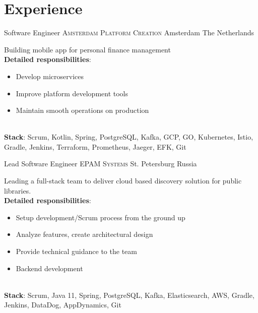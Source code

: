 \documentclass[11pt,a4paper,sans]{moderncv}
\begin{document}
\makecvtitle %


\section{Experience}

    {Software Engineer}
    {\textsc{Amsterdam Platform Creation}}
    {Amsterdam}
    {The Netherlands}
    {
        Building mobile app for personal finance management
        \\
        \textbf{Detailed responsibilities}:
        \begin{itemize}
            \item Develop microservices
            \item Improve platform development tools
            \item Maintain smooth operations on production
        \end{itemize}
        \\ 
        \textbf{Stack}: Scrum, Kotlin, Spring, PostgreSQL, Kafka, GCP, GO, Kubernetes, Istio, Gradle, Jenkins, Terraform, Prometheus, Jaeger, EFK, Git
    }

    {Lead Software Engineer}
    {\textsc{EPAM Systems}}
    {St. Petersburg}
    {Russia}
    {
        Leading a full-stack team to deliver cloud based discovery solution for public libraries.
        \\
        \textbf{Detailed responsibilities}:
        \begin{itemize}
            \item Setup development/Scrum process from the ground up
            \item Analyze features, create architectural design
            \item Provide technical guidance to the team
            \item Backend development
        \end{itemize}
        \\ 
        \textbf{Stack}: Scrum, Java 11, Spring, PostgreSQL, Kafka, Elasticsearch, AWS, Gradle, Jenkins, DataDog, AppDynamics, Git
    }

\hfill \\
\end{document}
